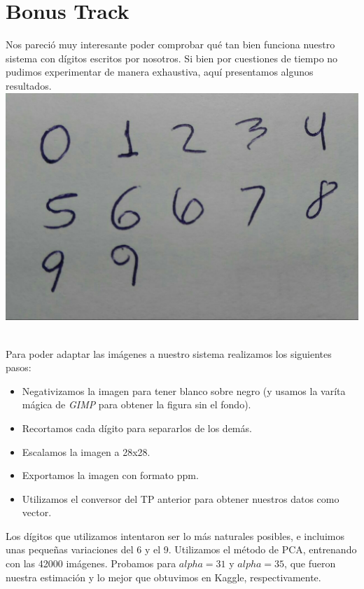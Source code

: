\newpage
\section{Bonus Track}

Nos pareció muy interesante poder comprobar qué tan bien funciona nuestro sistema con dígitos escritos por nosotros. Si bien por cuestiones de tiempo no pudimos experimentar de manera exhaustiva, aquí presentamos algunos resultados. \\

{\centering
    \includegraphics[scale=0.30]{informe/imagenes/realv1.jpg} \\
}
$ $\newline

Para poder adaptar las imágenes a nuestro sistema realizamos los siguientes pasos:

\begin{itemize}
\item Negativizamos la imagen para tener blanco sobre negro (y usamos la varíta mágica de \textit{GIMP} para obtener la figura sin el fondo).
\item Recortamos cada dígito para separarlos de los demás.
\item Escalamos la imagen a 28x28.
\item Exportamos la imagen con formato ppm.
\item Utilizamos el conversor del TP anterior para obtener nuestros datos como vector.
\end{itemize}

Los dígitos que utilizamos intentaron ser lo más naturales posibles, e incluimos unas pequeñas variaciones del 6 y el 9. Utilizamos el método de PCA, entrenando con las 42000 imágenes. Probamos para $alpha=31$ y $alpha=35$, que fueron nuestra estimación y lo mejor que obtuvimos en Kaggle, respectivamente. \\


